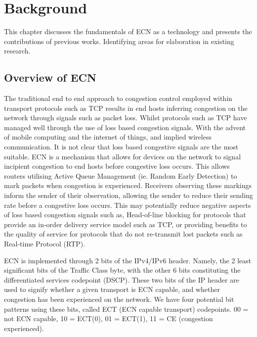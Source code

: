 \documentclass{l4proj}
\begin{document}
\chapter{Background}

This chapter discusses the fundamentals of ECN as a technology and presents the contributions of previous works. Identifying areas for elaboration in existing research.

\section{Overview of ECN}

The traditional end to end approach to congestion control employed within transport protocols such as TCP results in end hosts inferring congestion on the network through signals such as packet loss. Whilst protocols such as TCP have managed well through the use of loss based congestion signals. With the advent of mobile computing and the internet of things, and implied wireless communication. It is not clear that loss based congestive signals are the most suitable.
ECN is a mechanism that allows for devices on the network to signal incipient congestion to end hosts before congestive loss occurs. This allows routers utilising Active Queue Management (ie. Random Early Detection) to mark packets when congestion is experienced. Receivers observing these markings inform the sender of their observation, allowing the sender to reduce their sending rate before a congestive loss occurs. This may potentially reduce negative aspects of loss based congestion signals such as, Head-of-line blocking for protocols that provide an in-order delivery service model such as TCP, or providing benefits to the quality of service for protocols that do not re-transmit lost packets such as Real-time Protocol (RTP).

ECN is implemented through 2 bits of the IPv4/IPv6 header. Namely, the 2 least significant bits of the Traffic Class byte, with the other 6 bits constituting the differentiated services codepoint (DSCP). These two bits of the IP header are used to signify whether a given transport is ECN capable, and whether congestion has been experienced on the network. We have four potential bit patterns using these bits, called ECT (ECN capable transport) codepoints. 00 = not ECN capable, 10 = ECT(0), 01 = ECT(1), 11 = CE (congestion experienced).
\end{document}
